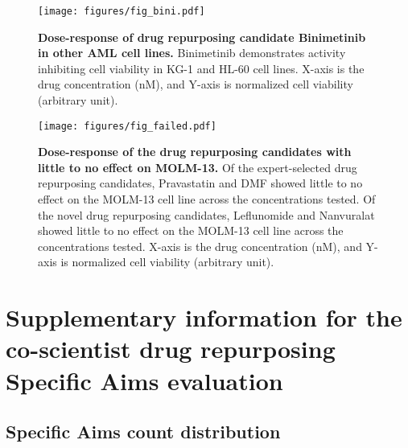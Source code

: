 \begin{figure}[htbp!]
\centering
\texttt{[image: figures/fig\_bini.pdf]}
\vspace{0.1cm}
\caption{\textbf{Dose-response of drug repurposing candidate Binimetinib in other AML cell lines.} Binimetinib demonstrates activity inhibiting cell viability in KG-1 and HL-60 cell lines. X-axis is the drug concentration (nM), and Y-axis is normalized cell viability (arbitrary unit).}
\label{fig:fig_wetlab_appendix}
\end{figure}

\begin{figure}[ht!]
\centering
\texttt{[image: figures/fig\_failed.pdf]}
\vspace{0.1cm}
\caption{\textbf{Dose-response of the drug repurposing candidates with little to no effect on MOLM-13.} Of the expert-selected drug repurposing candidates, Pravastatin and DMF showed little to no effect on the MOLM-13 cell line across the concentrations tested. Of the novel drug repurposing candidates, Leflunomide and Nanvuralat showed little to no effect on the MOLM-13 cell line across the concentrations tested. X-axis is the drug concentration (nM), and Y-axis is normalized cell viability (arbitrary unit).}
\label{fig:fig_wetlab_appendix_failed}
\end{figure}



\clearpage
\section{Supplementary information for the co-scientist drug repurposing Specific Aims evaluation}
\label{sec:supp_aims}

\subsection{Specific Aims count distribution}
\label{sec:specific_aims_count}

